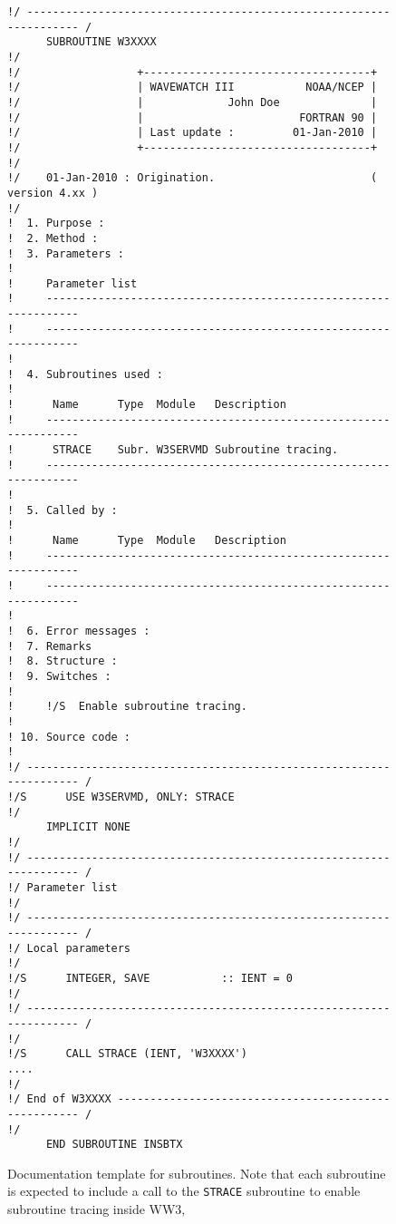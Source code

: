 \documentclass[12pt]{article}
\newcommand{\ws}{WW3}
\newcommand{\code}{\tt}
\newcounter{myfigno}[section]
\newenvironment{myfig}[1]{\begin{figure}[#1]
                         \refstepcounter{myfigno}}                       
                        {\end{figure}}
\newcommand{\myfcap}[1]{\begin{list}{\ff Fig. \themyfigno\ :~\hfill}
                       {\rightmargin 8mm \labelsep 0mm
                        \labelwidth 8mm \leftmargin 8mm
                        \topsep 0mm \parskip 0mm \partopsep 0mm }
                        \item \ff #1 \end{list}}
\renewcommand{\themyfigno}{\thesection.\arabic{myfigno}}
\begin{document}
\begin{myfig}{tbp}
\begin{center}
\begin{minipage}[c]{4.5in}
{\scriptsize \begin{verbatim}
!/ ------------------------------------------------------------------- /
      SUBROUTINE W3XXXX
!/
!/                  +-----------------------------------+
!/                  | WAVEWATCH III           NOAA/NCEP |
!/                  |             John Doe              |
!/                  |                        FORTRAN 90 |
!/                  | Last update :         01-Jan-2010 |
!/                  +-----------------------------------+
!/
!/    01-Jan-2010 : Origination.                        ( version 4.xx )
!/
!  1. Purpose :
!  2. Method :
!  3. Parameters :
!
!     Parameter list
!     ----------------------------------------------------------------
!     ----------------------------------------------------------------
!
!  4. Subroutines used :
!
!      Name      Type  Module   Description
!     ----------------------------------------------------------------
!      STRACE    Subr. W3SERVMD Subroutine tracing.
!     ----------------------------------------------------------------
!
!  5. Called by :
!
!      Name      Type  Module   Description
!     ----------------------------------------------------------------
!     ----------------------------------------------------------------
!
!  6. Error messages :
!  7. Remarks 
!  8. Structure :
!  9. Switches :
!
!     !/S  Enable subroutine tracing.
!
! 10. Source code :
!
!/ ------------------------------------------------------------------- /
!/S      USE W3SERVMD, ONLY: STRACE
!/
      IMPLICIT NONE
!/
!/ ------------------------------------------------------------------- /
!/ Parameter list
!/
!/ ------------------------------------------------------------------- /
!/ Local parameters
!/
!/S      INTEGER, SAVE           :: IENT = 0
!/
!/ ------------------------------------------------------------------- /
!/
!/S      CALL STRACE (IENT, 'W3XXXX')
....
!/
!/ End of W3XXXX ----------------------------------------------------- /
!/
      END SUBROUTINE INSBTX
\end{verbatim}}
\end{minipage}
\end{center}

\myfcap{Documentation template for subroutines. Note that each subroutine is
        expected to include a call to the {\code STRACE} subroutine to enable
        subroutine tracing inside \ws,}
\label{fig:docu_subr}
\end{myfig}
\end{document}
